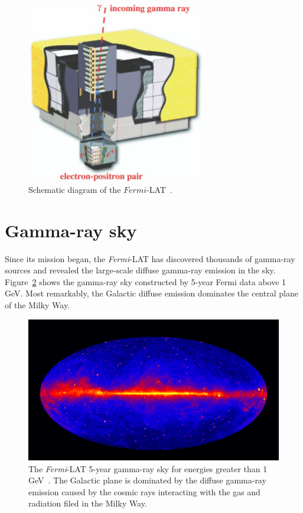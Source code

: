 \documentclass[doublespace,nopageskip]{VTthesis}
\begin{document}
\begin{figure}[htb]
    \centering
    \includegraphics[width=0.7\textwidth]{Figures/Intro/lat.jpg}
    \caption{Schematic diagram of the $Fermi$-LAT~\cite{2009ApJ...697.1071A}.}
    \label{fig:lat}
\end{figure}

\section{Gamma-ray sky}\label{se:gamma-sky}

Since its mission began, the \textit{Fermi}-LAT has discovered thousands of gamma-ray sources and revealed the large-scale diffuse gamma-ray emission in the sky. Figure~\ref{fig:gamma_sky} shows the gamma-ray sky constructed by 5-year Fermi data above 1 GeV. Most remarkably, the Galactic diffuse emission dominates the central plane of the Milky Way.

\begin{figure}[htb]
    \centering
    \includegraphics[width=1\textwidth]{Figures/Intro/Femri_5_year_2500x1407.jpg}
    \caption{The \textit{Fermi}-LAT 5-year gamma-ray sky for energies greater than 1 GeV~\cite{NASAs2013}. The Galactic plane is dominated by the diffuse gamma-ray emission caused by the cosmic rays interacting with the gas and radiation filed in the Milky Way.}
    \label{fig:gamma_sky}
\end{figure}
\end{document}
